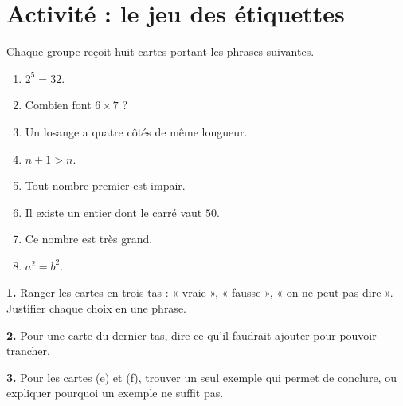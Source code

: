 \section{Activité : le jeu des étiquettes}
\begin{activity}
Chaque groupe reçoit huit cartes portant les phrases suivantes.
\begin{enumerate}
\item[(a)] $2^5=32$.
\item[(b)] Combien font $6\times7$ ?
\item[(c)] Un losange a quatre côtés de même longueur.
\item[(d)] $n+1>n$.
\item[(e)] Tout nombre premier est impair.
\item[(f)] Il existe un entier dont le carré vaut $50$.
\item[(g)] Ce nombre est très grand.
\item[(h)] $a^2=b^2$.
\end{enumerate}
\textbf{1.} Ranger les cartes en trois tas : « vraie », « fausse », « on ne peut pas dire ». Justifier chaque choix en une phrase.\par
\textbf{2.} Pour une carte du dernier tas, dire ce qu'il faudrait ajouter pour pouvoir trancher.\par
\textbf{3.} Pour les cartes (e) et (f), trouver un seul exemple qui permet de conclure, ou expliquer pourquoi un exemple ne suffit pas.
\end{activity}

